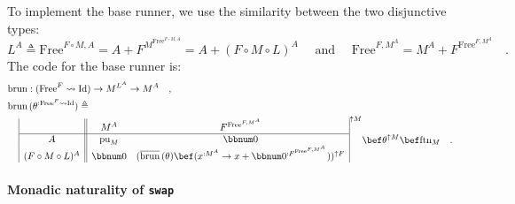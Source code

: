 To implement the base runner, we use the similarity between the two
disjunctive types:
\[
L^{A}\triangleq\text{Free}^{F\circ M,A}=A+F^{M^{\text{Free}^{F\circ M,A}}}=A+(F\circ M\circ L)^{A}\quad\text{ and }\quad\text{Free}^{F,M^{A}}=M^{A}+F^{\text{Free}^{F,M^{A}}}\quad.
\]
The code for the base runner is:
\begin{align*}
 & \text{brun}:(\text{Free}^{F}\leadsto\text{Id})\rightarrow M^{L^{A}}\rightarrow M^{A}\quad,\\
 & \text{brun}\,(\theta^{:\text{Free}^{F}\leadsto\text{Id}})\triangleq\\
 & \quad\,\begin{array}{|c||cc|}
 & M^{A} & F^{\text{Free}^{F,M^{A}}}\\
\hline A & \text{pu}_{M} & \bbnum 0\\
(F\circ M\circ L)^{A} & \bbnum 0 & (\overline{\text{brun}}\,(\theta)\bef(x^{:M^{A}}\rightarrow x+\bbnum 0^{:F^{\text{Free}^{F,M^{A}}}}))^{\uparrow F}
\end{array}^{\uparrow M}\bef\theta^{\uparrow M}\bef\text{ftn}_{M}\quad.
\end{align*}


\paragraph{Monadic naturality of \texttt{swap}}

